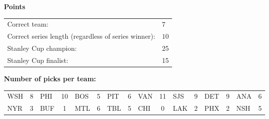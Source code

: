 \documentclass[10pt]{article}
\begin{document}
{\bf Points}\\
\begin{minipage}{12cm}
    \begin{tabular}{l l}
        Correct team:	& $7$\\
        Correct series length (regardless of series winner):	& $10$\\
        Stanley Cup champion:	& 25\\
        Stanley Cup finalist:	& 15\\
    \end{tabular}

    \vspace{1cm}
    {\bf Number of picks per team:}\\
    \begin{tabular}{lc | lc | lc | lc | lc | lc | lc | lc }
        WSH & 8 & PHI & 10 & BOS & 5 & PIT & 6 & VAN & 11 & SJS & 9 & DET & 9 & ANA & 6 \\
        NYR & 3 & BUF & 1 & MTL & 6 & TBL & 5 & CHI & 0 & LAK & 2 & PHX & 2 & NSH & 5 \\
    \end{tabular}
\end{minipage}
\end{document}
